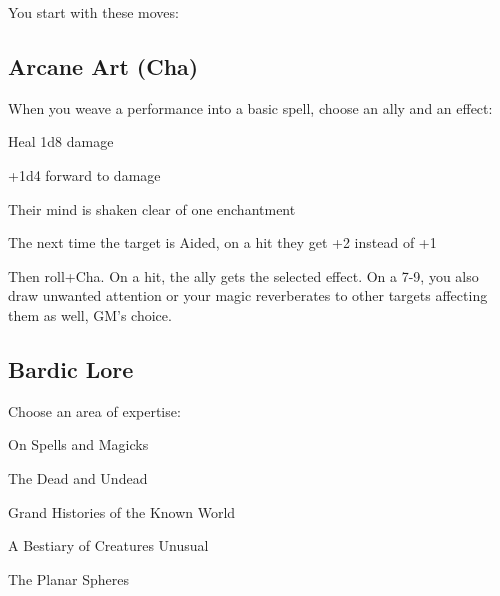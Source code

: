          

           
\startInstructions
You start with these moves:
\stopInstructions
           
\subsection{Arcane Art (Cha)}     
           

When you weave a performance into a basic spell, choose an ally and an effect:

           
\startitemize[1,packed]
             
\item Heal 1d8 damage

             
\item +1d4 forward to damage

             
\item Their mind is shaken clear of one enchantment

             
\item The next time the target is Aided, on a hit they get +2 instead of +1

           
\stopitemize
           

Then roll+Cha. On a hit, the ally gets the selected effect. On a 7-9, you also draw unwanted attention or your magic reverberates to other targets affecting them as well, GM's choice.

           
\subsection{Bardic Lore}    
           

Choose an area of expertise:

           
\startitemize[1,packed]
             
\item On Spells and Magicks

             
\item The Dead and Undead

             
\item Grand Histories of the Known World

             
\item A Bestiary of Creatures Unusual

             
\item The Planar Spheres

